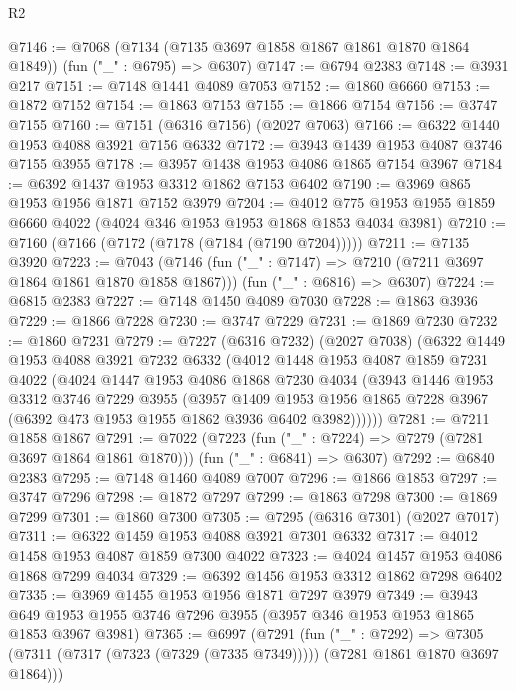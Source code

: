 \begin{lexlean}{R2}
\begin{coremodule}
@7146 := @7068
    (@7134 (@7135 @3697 @1858 @1867 @1861 @1870 @1864 @1849))
    (fun ("_" : @6795) => @6307)
@7147 := @6794 @2383
@7148 := @3931 @217
@7151 := @7148 @1441 @4089 @7053
@7152 := @1860 @6660
@7153 := @1872 @7152
@7154 := @1863 @7153
@7155 := @1866 @7154
@7156 := @3747 @7155
@7160 := @7151 (@6316 @7156) (@2027 @7063)
@7166 := @6322 @1440 @1953 @4088 @3921 @7156 @6332
@7172 := @3943 @1439 @1953 @4087 @3746 @7155 @3955
@7178 := @3957 @1438 @1953 @4086 @1865 @7154 @3967
@7184 := @6392 @1437 @1953 @3312 @1862 @7153 @6402
@7190 := @3969 @865 @1953 @1956 @1871 @7152 @3979
@7204 := @4012 @775 @1953 @1955 @1859 @6660 @4022 (@4024 @346 @1953 @1953 @1868 @1853 @4034 @3981)
@7210 := @7160 (@7166 (@7172 (@7178 (@7184 (@7190 @7204)))))
@7211 := @7135 @3920
@7223 := @7043
    (@7146 (fun ("_" : @7147) => @7210 (@7211 @3697 @1864 @1861 @1870 @1858 @1867)))
    (fun ("_" : @6816) => @6307)
@7224 := @6815 @2383
@7227 := @7148 @1450 @4089 @7030
@7228 := @1863 @3936
@7229 := @1866 @7228
@7230 := @3747 @7229
@7231 := @1869 @7230
@7232 := @1860 @7231
@7279 := @7227
    (@6316 @7232)
    (@2027 @7038)
    (@6322
      @1449
      @1953
      @4088
      @3921
      @7232
      @6332
      (@4012
        @1448
        @1953
        @4087
        @1859
        @7231
        @4022
        (@4024
          @1447
          @1953
          @4086
          @1868
          @7230
          @4034
          (@3943
            @1446
            @1953
            @3312
            @3746
            @7229
            @3955
            (@3957
              @1409
              @1953
              @1956
              @1865
              @7228
              @3967
              (@6392 @473 @1953 @1955 @1862 @3936 @6402 @3982))))))
@7281 := @7211 @1858 @1867
@7291 := @7022
    (@7223 (fun ("_" : @7224) => @7279 (@7281 @3697 @1864 @1861 @1870)))
    (fun ("_" : @6841) => @6307)
@7292 := @6840 @2383
@7295 := @7148 @1460 @4089 @7007
@7296 := @1866 @1853
@7297 := @3747 @7296
@7298 := @1872 @7297
@7299 := @1863 @7298
@7300 := @1869 @7299
@7301 := @1860 @7300
@7305 := @7295 (@6316 @7301) (@2027 @7017)
@7311 := @6322 @1459 @1953 @4088 @3921 @7301 @6332
@7317 := @4012 @1458 @1953 @4087 @1859 @7300 @4022
@7323 := @4024 @1457 @1953 @4086 @1868 @7299 @4034
@7329 := @6392 @1456 @1953 @3312 @1862 @7298 @6402
@7335 := @3969 @1455 @1953 @1956 @1871 @7297 @3979
@7349 := @3943 @649 @1953 @1955 @3746 @7296 @3955 (@3957 @346 @1953 @1953 @1865 @1853 @3967 @3981)
@7365 := @6997
    (@7291
      (fun ("_" : @7292) =>
      @7305 (@7311 (@7317 (@7323 (@7329 (@7335 @7349))))) (@7281 @1861 @1870 @3697 @1864)))

\end{coremodule}
\end{lexlean}
